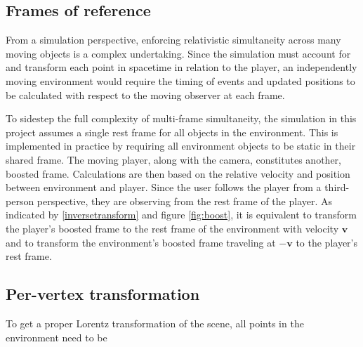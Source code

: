\documentclass[a4paper]{article}
\begin{document}
\subsection{Frames of reference}

From a simulation perspective, enforcing relativistic simultaneity across many moving objects is a complex undertaking. Since the simulation must account for and transform each point in spacetime in relation to the player, an independently moving environment would require the timing of events and updated positions to be calculated with respect to the moving observer at each frame.

To sidestep the full complexity of multi-frame simultaneity, the simulation in this project assumes a single rest frame for all objects in the environment. This is implemented in practice by requiring all environment objects to be static in their shared frame. The moving player, along with the camera, constitutes another, boosted frame. Calculations are then based on the relative velocity and position between environment and player. Since the user follows the player from a third-person perspective, they are observing from the rest frame of the player. As indicated by \eqref{inversetransform} and figure \ref{fig:boost}, it is equivalent to transform the player's boosted frame to the rest frame of the environment with velocity $\mathbf{v}$ and to transform the environment's boosted frame traveling at $-\mathbf{v}$ to the player's rest frame.







\subsection{Per-vertex transformation}
To get a proper Lorentz transformation of the scene, all points in the environment need to be 
\end{document}
